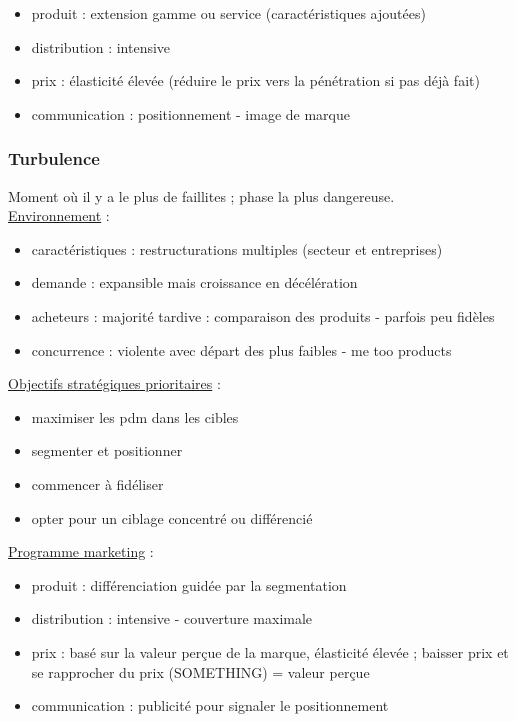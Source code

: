 			\begin{itemize}
				\item produit : extension gamme ou service (caractéristiques ajoutées)
				\item distribution : intensive
				\item prix : élasticité élevée (réduire le prix vers la pénétration si pas déjà fait)
				\item communication : positionnement - image de marque
			\end{itemize}
			
			\subsubsection{Turbulence}
			
			Moment où il y a le plus de faillites ; phase la plus dangereuse. \\
			
			\underline{Environnement} :
		
			\begin{itemize}
				\item caractéristiques : restructurations multiples (secteur et entreprises)
				\item demande : expansible mais croissance en décélération
				\item acheteurs : majorité tardive : comparaison des produits - parfois peu fidèles
				\item concurrence : violente avec départ des plus faibles - me too products
			\end{itemize}
			\n
			\underline{Objectifs stratégiques prioritaires} :
			
			\begin{itemize}
				\item maximiser les pdm dans les cibles
				\item segmenter et positionner
				\item commencer à fidéliser
				\item opter pour un ciblage concentré ou différencié
			\end{itemize}
			\n
			\underline{Programme marketing} :
			
			\begin{itemize}
				\item produit : différenciation guidée par la segmentation
				\item distribution : intensive - couverture maximale
				\item prix : basé sur la valeur perçue de la marque, élasticité élevée ; baisser prix et se rapprocher du prix (SOMETHING) = valeur perçue
				\item communication : publicité pour signaler le positionnement
			\end{itemize}
			
